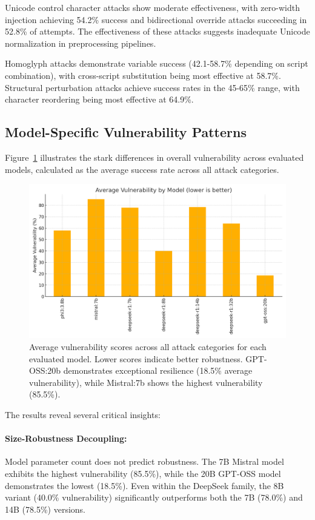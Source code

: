 \documentclass[11pt]{article}
\begin{document}
\begin{multicols}{2}
Unicode control character attacks show moderate effectiveness, with zero-width injection achieving 54.2\% success and bidirectional override attacks succeeding in 52.8\% of attempts. The effectiveness of these attacks suggests inadequate Unicode normalization in preprocessing pipelines.

Homoglyph attacks demonstrate variable success (42.1-58.7\% depending on script combination), with cross-script substitution being most effective at 58.7\%. Structural perturbation attacks achieve success rates in the 45-65\% range, with character reordering being most effective at 64.9\%.

\subsection{Model-Specific Vulnerability Patterns}

Figure~\ref{fig:avg-vuln} illustrates the stark differences in overall vulnerability across evaluated models, calculated as the average success rate across all attack categories.

\begin{figure}[H]
\centering
\includegraphics[width=\columnwidth]{avg_vulnerability_by_model.png}
\caption{Average vulnerability scores across all attack categories for each evaluated model. Lower scores indicate better robustness. GPT-OSS:20b demonstrates exceptional resilience (18.5\% average vulnerability), while Mistral:7b shows the highest vulnerability (85.5\%).}
\label{fig:avg-vuln}
\end{figure}

The results reveal several critical insights:

\paragraph{Size-Robustness Decoupling:} Model parameter count does not predict robustness. The 7B Mistral model exhibits the highest vulnerability (85.5\%), while the 20B GPT-OSS model demonstrates the lowest (18.5\%). Even within the DeepSeek family, the 8B variant (40.0\% vulnerability) significantly outperforms both the 7B (78.0\%) and 14B (78.5\%) versions.


\end{multicols}
\end{document}
